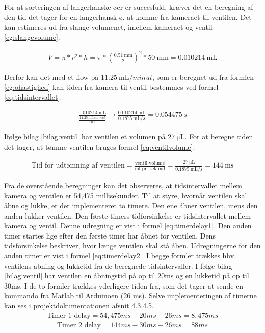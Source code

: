 For at sorteringen af langerhanske øer er succesfuld, kræver det en beregning af den tid det tager for en langerhansk ø, at komme fra kameraet til ventilen. Det kan estimeres ud fra slange volumenet, imellem kameraet og ventil \ref{eg:slangevolume}.

\begin{align}
V=\pi*r^2*h=\pi*(\frac{\SI{0,51}{\milli\metre}}{2})^2*\SI{50}{\milli\metre}=\SI{0,010214}{\milli\liter}
\label{eg:slangevolume}
\end{align}

Derfor kan det med et flow på $\SI{11,25}{\milli\liter/minut}$, som er beregnet ud fra formlen \ref{eg:ohastighed} kan tiden fra kamera til ventil bestemmes ved formel \ref{eq:tidsintervallet}. 
 
\begin{align}
\frac{\SI{0,010214}{\milli\liter}}{\frac{\SI{11,25}{\milli\liter/minut}}{\SI{60}{\second}}}\to\frac{\SI{0,010214}{\milli\liter}}{\SI{0,1875}{\milli\liter/s}}=\SI{0.054475}{\second}
\label{eq:tidsintervallet}
\end{align} 

Ifølge bilag \ref{bilag:ventil} har ventilen et volumen på $\SI{27}{\micro\liter}$. For at beregne tiden det tager, at tømme ventilen bruges formel \ref{eq:ventilvolume}. %

\begin{align}
\text{Tid for udtømning af ventilen} = \frac{\text{ventil volume}}{\text{ml pr. sekund}}=\frac{\SI{27}{\micro\liter}}{\SI{0,1875}{\milli\liter/s}}=\SI{144}{\milli\second}
\label{eq:ventilvolume}
\end{align}

Fra de overstående beregninger kan det observeres, at tidsintervallet mellem kamera og ventilen er 54,475 millisekunder. Til at styre, hvornår ventilen skal åbne og lukke, er der implementeret to timere. Den ene åbner ventilen, mens den anden lukker ventilen. Den første timers tidforsinkelse er tidsintervallet mellem kamera og ventil. Denne udregning er vist i formel \ref{eq:timerdelay1}. Den anden timer startes lige efter den første timer har åbnet for ventilen. Dens tidsforsinkelse beskriver, hvor længe ventilen skal stå åben. Udregningerne for den anden timer er vist i formel \ref{eq:timerdelay2}. I begge formler trækkes hhv. ventilens åbning og lukketid fra de beregnede tidsintervaller. I følge bilag \ref{bilag:ventil} har ventilen en åbningstid på op til 20ms og en lukketid på op til 30ms. I de to formler trækkes yderligere tiden fra, som det tager at sende en kommando fra Matlab til Arduinoen (26 ms). Selve implementeringen af timerne kan ses i projektdokumentationen afsnit 4.3.4.5. 
\begin{align}
\text{Timer 1 delay}=54,475ms-20ms-26ms=8,475ms
\label{eq:timerdelay1}
\end{align} 
\begin{align}
\text{Timer 2 delay}=144ms-30ms-26ms= 88ms
\label{eq:timerdelay2}
\end{align} 

